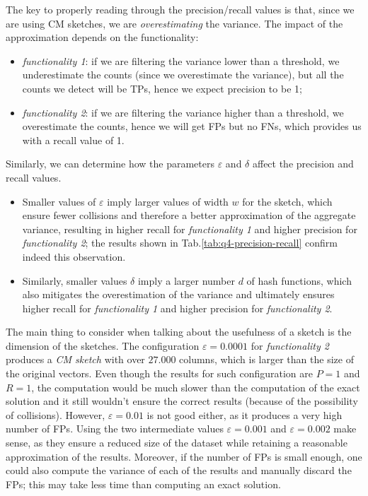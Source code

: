 The key to properly reading through the precision/recall values is that, since we are using CM sketches, we are \emph{overestimating} the variance. The impact of the approximation depends on the functionality:
\begin{itemize}
    \item \emph{functionality 1}: if we are filtering the variance lower than a threshold, we underestimate the counts (since we overestimate the variance), but all the counts we detect will be TPs, hence we expect precision to be 1;
    \item \emph{functionality 2}: if we are filtering the variance higher than a threshold, we overestimate the counts, hence we will get FPs but no FNs, which provides us with a recall value of 1.
\end{itemize}
Similarly, we can determine how the parameters $\varepsilon$ and $\delta$ affect the precision and recall values.
\begin{itemize}
    \item Smaller values of $\varepsilon$ imply larger values of width $w$ for the sketch, which ensure fewer collisions and therefore a better approximation of the aggregate variance, resulting in higher recall for \emph{functionality 1} and higher precision for \emph{functionality 2}; the results shown in Tab.\ref{tab:q4-precision-recall} confirm indeed this observation.
    \item Similarly, smaller values $\delta$ imply a larger number $d$ of hash functions, which also mitigates the overestimation of the variance and ultimately ensures higher recall for \emph{functionality 1} and higher precision for \emph{functionality 2}.
\end{itemize}

The main thing to consider when talking about the usefulness of a sketch is the dimension of the sketches. The configuration $\varepsilon = 0.0001$ for \emph{functionality 2} produces a \emph{CM sketch} with over $27.000$ columns, which is larger than the size of the original vectors. Even though the results for such configuration are $P=1$ and $R=1$, the computation would be much slower than the computation of the exact solution 
and it still wouldn't ensure the correct results (because of the possibility of collisions). However, $\varepsilon = 0.01$ is not good either, as it produces a very high number of FPs. Using the two intermediate values $\varepsilon = 0.001$ and $\varepsilon = 0.002$ make sense, as they ensure a reduced size of the dataset while retaining a reasonable approximation of the results. Moreover, if the number of FPs is small enough, one could also compute the variance of each of the results and manually discard the FPs; this may take less time than computing an exact solution.


